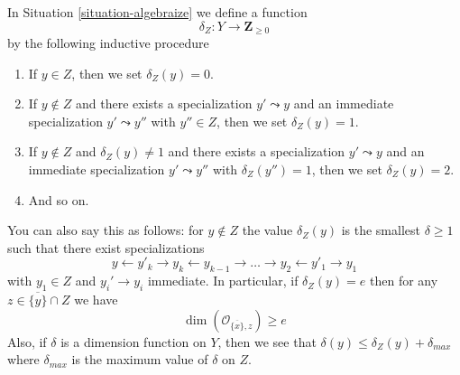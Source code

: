 \noindent
In Situation \ref{situation-algebraize} we define a function
$$
\delta_Z : Y \longrightarrow \mathbf{Z}_{\geq 0}
$$
by the following inductive procedure
\begin{enumerate}
\item If $y \in Z$, then we set $\delta_Z(y) = 0$.
\item If $y \not \in Z$ and there exists a specialization
$y' \leadsto y$ and an immediate specialization $y' \leadsto y''$
with $y'' \in Z$, then we set $\delta_Z(y) = 1$.
\item If $y \not \in Z$ and $\delta_Z(y) \not = 1$ and there exists a
specialization $y' \leadsto y$ and an immediate specialization
$y' \leadsto y''$
with $\delta_Z(y'') = 1$, then we set $\delta_Z(y) = 2$.
\item And so on.
\end{enumerate}
You can also say this as follows: for $y \not \in Z$
the value $\delta_Z(y)$ is the smallest $\delta \geq 1$
such that there exist specializations
$$
y \leftarrow y'_k \to y_k \leftarrow y_{k - 1} \to \ldots \to
y_2 \leftarrow y'_1 \to y_1
$$
with $y_1 \in Z$ and $y_i' \to y_i$ immediate. In particular, if
$\delta_Z(y) = e$ then for any $z \in \overline{\{y\}} \cap Z$
we have
$$
\dim(\mathcal{O}_{\overline{\{x\}}, z}) \geq e
$$
Also, if $\delta$ is a dimension function on $Y$, then we see that
$\delta(y) \leq \delta_Z(y) + \delta_{max}$ where $\delta_{max}$
is the maximum value of $\delta$ on $Z$.

